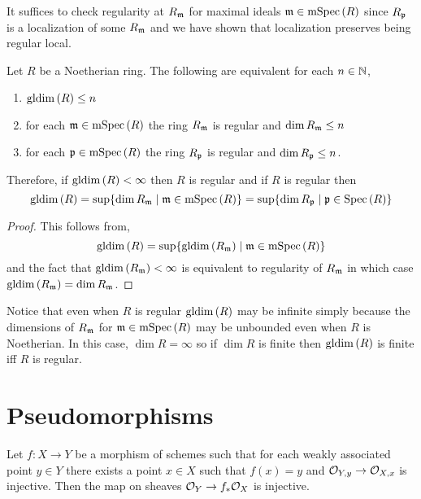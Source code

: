 \documentclass[12pt]{article}
\begin{document}
\begin{rmk}
It suffices to check regularity at $R_{\mathfrak{m}}$ for maximal ideals $\mathfrak{m} \in \mathrm{mSpec}\left( R \right)$ since $R_{\mathfrak{p}}$ is a localization of some $R_{\mathfrak{m}}$ and we have shown that localization preserves being regular local.
\end{rmk}

\begin{prop}
Let $R$ be a Noetherian ring. The following are equivalent for each $n \in \mathbb{N}$,
\begin{enumerate}
\item $\mathrm{gldim}\left( R \right) \le n$

\item for each $\mathfrak{m} \in \mathrm{mSpec}\left( R \right)$ the ring $R_{\mathfrak{m}}$ is regular and $\dim{R_{\mathfrak{m}}} \le n$

\item for each $\mathfrak{p} \in \mathrm{mSpec}\left( R \right)$ the ring $R_{\mathfrak{p}}$ is regular and $\dim{R_{\mathfrak{p}}} \le n$.
\end{enumerate}
Therefore, if $\mathrm{gldim}\left( R \right) < \infty$ then $R$ is regular and if $R$ is regular then
\[ \mathrm{gldim}\left( R \right) = \sup \{ \dim{R_{\mathfrak{m}}} \mid \mathfrak{m} \in \mathrm{mSpec}\left( R \right) \} = \sup \{ \dim{R_{\mathfrak{p}}} \mid \mathfrak{p} \in \mathrm{Spec}\left( R \right) \} \]
\end{prop}

\begin{proof}
This follows from,
\[ \mathrm{gldim}\left( R \right) = \sup \{ \mathrm{gldim}\left( R_{\mathfrak{m}} \right) \mid \mathfrak{m} \in \mathrm{mSpec}\left( R \right) \} \]
and the fact that $\mathrm{gldim}\left( R_{\mathfrak{m}} \right) < \infty$ is equivalent to regularity of $R_{\mathfrak{m}}$ in which case $\mathrm{gldim}\left( R_{\mathfrak{m}} \right) = \dim{R_{\mathfrak{m}}}$. 
\end{proof}

\begin{rmk}
Notice that even when $R$ is regular $\mathrm{gldim}\left( R \right)$ may be infinite simply because the dimensions of $R_{\mathfrak{m}}$ for $\mathfrak{m} \in \mathrm{mSpec}\left( R \right)$ may be unbounded even when $R$ is Noetherian. In this case, $\dim{R} = \infty$ so if $\dim{R}$ is finite then $\mathrm{gldim}\left( R \right)$ is finite iff $R$ is regular.
\end{rmk}

\section{Pseudomorphisms}

\begin{lemma}
Let $f : X \to Y$ be a morphism of schemes such that for each weakly associated point $y \in Y$ there exists a point $x \in X$ such that $f(x) = y$ and $\mathcal{O}_{Y, y} \to \mathcal{O}_{X, x}$ is injective. Then the map on sheaves $\mathcal{O}_{Y} \to f_* \mathcal{O}_{X}$ is injective.
\end{lemma}
\end{document}
